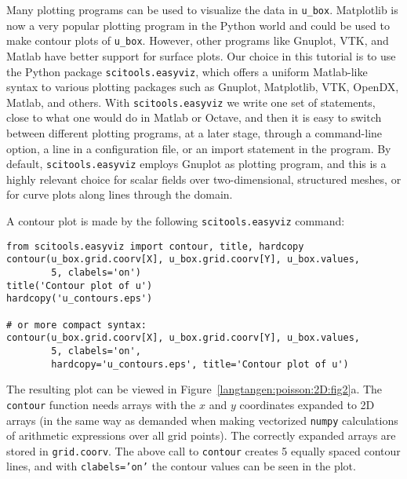 Many plotting programs can be used to visualize the data in
{\fontsize{12pt}{12pt}\verb!u_box!}.  Matplotlib is now a very popular plotting program in
the Python world and could be used to make contour plots of
{\fontsize{12pt}{12pt}\verb!u_box!}. However, other programs like Gnuplot, VTK, and Matlab have better
support for surface plots. Our choice in this tutorial is to use the
Python package {\fontsize{12pt}{12pt}\texttt{scitools.easyviz}}, which offers a uniform
Matlab-like syntax to various plotting packages such as Gnuplot,
Matplotlib, VTK, OpenDX, Matlab, and others. With {\fontsize{12pt}{12pt}\texttt{scitools.easyviz}} we
write one set of statements, close to what one would do in Matlab or
Octave, and then it is easy to switch between different plotting
programs, at a later stage, through a command-line option, a line in a
configuration file, or an import statement in the program.  By
default, {\fontsize{12pt}{12pt}\texttt{scitools.easyviz}} employs Gnuplot as plotting program,
and this is a highly relevant choice for scalar fields over two-dimensional,
structured meshes, or for curve plots along lines through the domain.

A contour plot is made by the following {\fontsize{12pt}{12pt}\texttt{scitools.easyviz}} command:
\begin{Verbatim}[fontsize=\fontsize{10pt}{10pt},tabsize=8,baselinestretch=1.05,
fontfamily=tt,xleftmargin=7mm]
from scitools.easyviz import contour, title, hardcopy
contour(u_box.grid.coorv[X], u_box.grid.coorv[Y], u_box.values, 
        5, clabels='on')
title('Contour plot of u')
hardcopy('u_contours.eps') 

# or more compact syntax:
contour(u_box.grid.coorv[X], u_box.grid.coorv[Y], u_box.values,
        5, clabels='on',
        hardcopy='u_contours.eps', title='Contour plot of u')
\end{Verbatim}
\noindent
The resulting plot can be viewed in Figure~\ref{langtangen:poisson:2D:fig2}a.
The {\fontsize{12pt}{12pt}\texttt{contour}} function needs arrays with the $x$ and $y$ coordinates
expanded to 2D arrays (in the same way as demanded when
making vectorized
{\fontsize{12pt}{12pt}\texttt{numpy}} calculations of arithmetic expressions over all grid points).
The correctly expanded arrays are stored in {\fontsize{12pt}{12pt}\texttt{grid.coorv}}.
The above call to
{\fontsize{12pt}{12pt}\texttt{contour}} creates 5 equally spaced contour lines, and with
{\fontsize{12pt}{12pt}\texttt{clabels='on'}} the contour values can be seen in the plot.

